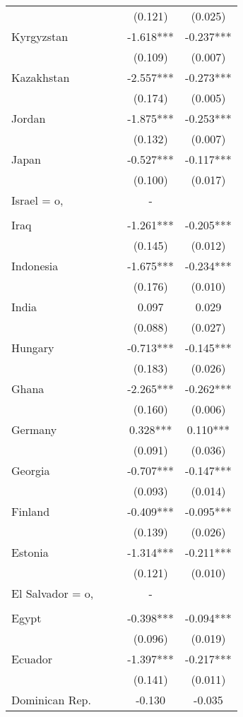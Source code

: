 \documentclass[]{article}
\begin{document}
\begin{tabular}{lcccc}
 &  &  & (0.121) & (0.025) \\
Kyrgyzstan &  &  & -1.618*** & -0.237*** \\
 &  &  & (0.109) & (0.007) \\
Kazakhstan &  &  & -2.557*** & -0.273*** \\
 &  &  & (0.174) & (0.005) \\
Jordan &  &  & -1.875*** & -0.253*** \\
 &  &  & (0.132) & (0.007) \\
Japan &  &  & -0.527*** & -0.117*** \\
 &  &  & (0.100) & (0.017) \\
Israel = o, &  &  & - &  \\
 &  &  &  &  \\
Iraq &  &  & -1.261*** & -0.205*** \\
 &  &  & (0.145) & (0.012) \\
Indonesia &  &  & -1.675*** & -0.234*** \\
 &  &  & (0.176) & (0.010) \\
India &  &  & 0.097 & 0.029 \\
 &  &  & (0.088) & (0.027) \\
Hungary &  &  & -0.713*** & -0.145*** \\
 &  &  & (0.183) & (0.026) \\
Ghana &  &  & -2.265*** & -0.262*** \\
 &  &  & (0.160) & (0.006) \\
Germany &  &  & 0.328*** & 0.110*** \\
 &  &  & (0.091) & (0.036) \\
Georgia &  &  & -0.707*** & -0.147*** \\
 &  &  & (0.093) & (0.014) \\
Finland &  &  & -0.409*** & -0.095*** \\
 &  &  & (0.139) & (0.026) \\
Estonia &  &  & -1.314*** & -0.211*** \\
 &  &  & (0.121) & (0.010) \\
El Salvador = o, &  &  & - &  \\
 &  &  &  &  \\
Egypt &  &  & -0.398*** & -0.094*** \\
 &  &  & (0.096) & (0.019) \\
Ecuador &  &  & -1.397*** & -0.217*** \\
 &  &  & (0.141) & (0.011) \\
Dominican Rep. &  &  & -0.130 & -0.035 \\

\end{tabular}
\end{document}
